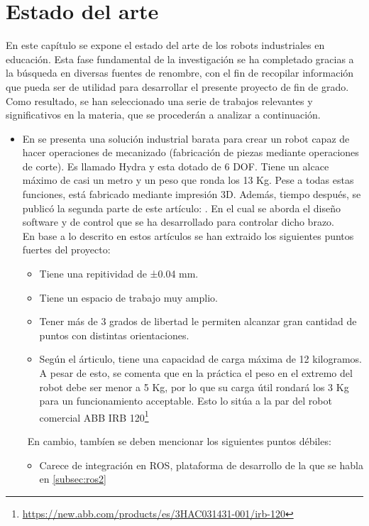 \chapter{Estado del arte}
\label{cap:capitulo2}
En este capítulo se expone el estado del arte de los robots industriales en educación. Esta fase fundamental de la 
investigación se ha completado gracias a la búsqueda en diversas fuentes de renombre, con el fin de 
recopilar información que pueda ser de utilidad para desarrollar el presente proyecto de fin de grado. Como resultado, se 
han seleccionado una serie de trabajos relevantes y significativos en la materia, que se procederán a analizar a continuación.
\begin{itemize}
    \item En \cite{KRIMPENIS2020103} se presenta una solución industrial barata para crear un robot capaz de hacer operaciones de mecanizado (fabricación 
    de piezas mediante operaciones de corte). Es llamado Hydra y esta dotado de 6 \ac{DOF}. Tiene un alcace máximo de casi un metro y un 
    peso que ronda los 13 Kg. Pese a todas estas funciones, está fabricado mediante impresión 3D. 
    Además, tiempo después, se publicó la segunda parte de este artículo: \cite{PAPAPASCHOS2020109}. En el cual se aborda el diseño software y de control 
    que se ha desarrollado para controlar dicho brazo. \\
    En base a lo descrito en estos artículos se han extraido los siguientes puntos fuertes del proyecto:
    \begin{itemize}
        \item Tiene una repitividad de ±0.04 mm.
        \item Tiene un espacio de trabajo muy amplio.
        \item Tener más de 3 grados de libertad le permiten alcanzar gran cantidad de puntos con distintas orientaciones.
        \item Según el árticulo, tiene una capacidad de carga máxima de 12 kilogramos. A pesar de esto, se comenta que en la práctica el peso en el 
        extremo del robot debe ser menor a 5 Kg, por lo que su carga útil rondará los 3 Kg para un funcionamiento acceptable. Esto lo sitúa a la par 
        del robot comercial ABB IRB 120\footnote{\url{https://new.abb.com/products/es/3HAC031431-001/irb-120}}  
    \end{itemize}\
    En cambio, tambíen se deben mencionar los siguientes puntos débiles:
    \begin{itemize}
        \item Carece de integración en \ac{ROS}, plataforma de desarrollo de la que se habla en \ref{subsec:ros2}

\end{itemize}
\end{itemize}
